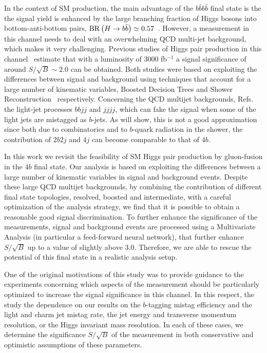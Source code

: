 In the context of SM production,
the main advantage of the $b\bar{b}b\bar{b}$ final state is the the signal yield
is enhanced by the large branching fraction of Higgs bosons into bottom-anti-bottom
pairs, ${\rm BR}\left( H\to b\bar{b}\right)\simeq 0.57$~\cite{Dittmaier:2012vm}.
%
However, a measurement in this channel
needs to deal with an overwhelming QCD multi-jet background,
which makes it very challenging.
%
Previous studies of Higgs pair production in this
channel~\cite{Wardrope:2014kya,deLima:2014dta}
estimate that with a luminosity of
3000 fb$^{-1}$ a signal significance of around $S/\sqrt{B}\sim 2.0$ can be obtained.
%
Both studies were based on exploiting the differences between signal and background
using techniques that account for a large number of kinematic
variables, Boosted Decision Trees
and Shower Reconstruction~\cite{Soper:2011cr} respectively.
%
Concerning the QCD multijet backgrounds, Refs.~\cite{Wardrope:2014kya,deLima:2014dta} the light-jet processes $bbjj$ and
$jjjj$,
which can fake the signal when 
some of the light jets are mistagged as $b$-jets.
%
As will show, this is not a good approximation since both due to
combinatorics and to $b$-quark radiation in the shower, the
contribution of $2b2j$ and $4j$ can become comparable
to that of $4b$.

In this work we revisit the feasibility of SM Higgs pair production by gluon-fusion
in the $4b$ final state.
%
Our analysis is based on exploiting the differences between a large
number of kinematic variables in signal and background events.
%
Despite these large QCD multijet backgrounds, by combining the contribution of different final state
topologies, resolved, boosted and intermediate, with a careful optimization
of the analysis strategy, we find that it is possible to obtain a reasonable
good signal discrimination.
%
To further enhance the significance of the measurements, signal and background events
are processed using a Multivariate Analysis (in particular a feed-forward neural
network), that further enhance $S/\sqrt{B}$ up to a value of slightly above 3.0.
%
Therefore, we are able to rescue the potential of this final state in a realistic
analysis setup.

One of the original motivations of this study was to provide guidance to the experiments
concerning which aspects of the measurement should be particularly optimized
to increase the signal significance in this channel.
%
In this respect, the study the dependence on our results on the $b$-tagging mistag
efficiency and the light and charm jet mistag rate, the jet energy and transverse
momentum resolution, or the Higgs invariant mass resolution.
%
In each of these cases, we determine the significance
$S/\sqrt{B}$ of the
measurement in both conservative and optimistic assumptions of these
parameters.


